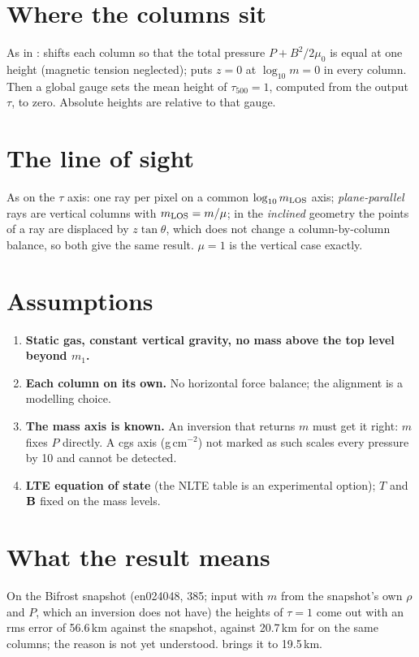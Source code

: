 \section{Where the columns sit}
As in :  shifts each column so that the total pressure $P+B^2/2\mu_0$ is equal at one
height (magnetic tension neglected);  puts $z=0$ at $\log_{10}m=0$ in every column. Then a global gauge sets the
mean height of $\tau_{500}=1$, computed from the output $\tau$, to zero. Absolute heights are relative to that gauge.

\section{The line of sight}
As on the $\tau$ axis: one ray per pixel on a common $\log_{10}m_{\rm LOS}$ axis; \emph{plane-parallel} rays are vertical columns
with $m_{\rm LOS}=m/\mu$; in the \emph{inclined} geometry the points of a ray are displaced by $z\tan\theta$, which does not change a
column-by-column balance, so both give the same result. $\mu=1$ is the vertical case exactly.

\section{Assumptions}
\begin{enumerate}[label=\textbf{A\arabic*.},leftmargin=2.2em]
\item \textbf{Static gas, constant vertical gravity, no mass above the top level beyond $m_1$.}
\item \textbf{Each column on its own.} No horizontal force balance; the alignment is a modelling choice.
\item \textbf{The mass axis is known.} An inversion that returns $m$ must get it right: $m$ fixes $P$ directly. A cgs axis
(g\,cm$^{-2}$) not marked as such scales every pressure by 10 and cannot be detected.
\item \textbf{LTE equation of state} (the NLTE table is an experimental option); $T$ and $\mathbf B$ fixed on the mass levels.
\end{enumerate}

\section{What the result means}
On the Bifrost snapshot (en024048, 385; input with $m$ from the snapshot's own $\rho$ and $P$, which an inversion does not have)
the heights of $\tau=1$ come out with an rms error of 56.6\,km against the snapshot, against 20.7\,km for  on
the same columns; the reason is not yet understood.  brings it to 19.5\,km.


